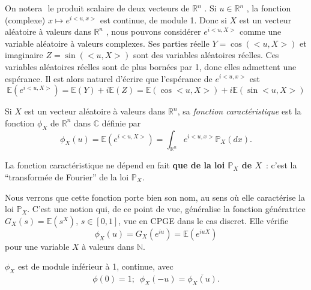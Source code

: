 On notera \(< x, y >\) le produit scalaire de deux vecteurs de
\(\mathbb{R}^n\) . Si \(u \in \mathbb{R}^n\) , la fonction (complexe)
\(x \mapsto e^{i < u,x>}\) est continue, de module 1. Donc si \(X\) est
un vecteur aléatoire à valeurs dans \(\mathbb{R}^n\) , nous pouvons
considérer \(e^{i < u,X>}\) comme une variable aléatoire à valeurs
complexes. Ses parties réelle \(Y = \cos(< u, X>)\) et imaginaire
\(Z = \sin(< u, X>)\) sont des variables aléatoires réelles. Ces
variables aléatoires réelles sont de plus bornées par 1, donc elles
admettent une espérance. Il est alors naturel d'écrire que l'espérance
de \(e^{i < u,x>}\) est
\[\mathbb{E}(e^{i < u,X>}) = \mathbb{E}(Y) + i \mathbb{E}(Z) = \mathbb{E}(\cos< u, X>) + i\mathbb{E}(\sin< u, X>) \]

\begin{definition}\label{IV-fonction-caractuxe9ristique}

Si \(X\) est un vecteur aléatoire à valeurs dans \(\mathbb{R}^n\), sa
\emph{fonction caractéristique} est la fonction \(\phi_X\) de
\(\mathbb{R}^n\) dans \(\mathbb{C}\) définie par
\[ \phi_X(u) = \mathbb{E}(e^{i < u,X>}) = \int_{\mathbb{R}^n} e^{i < u,x>} \mathbb{P}_X(dx).\]
\end{definition}

\begin{remarque}[{Interprétation}]\label{IV-interpruxe9tation-1}

La fonction caractéristique ne dépend en fait \textbf{que de la loi
\(\mathbb{P}_X\) de \(X\)}~: c'est la ``transformée de Fourier'' de la
loi \(\mathbb{P}_X\).

Nous verrons que cette fonction porte bien son nom, au sens où elle
caractérise la loi \(\mathbb{P}_X\). C'est une notion qui, de ce point
de vue, généralise la fonction génératrice
\(G_X(s) = \mathbb{E}(s^X), \, s \in [0,1]\), vue en CPGE dans le cas
discret. Elle vérifie \[\phi_X(u) = G_X(e^{iu}) = \mathbb{E}(e^{iuX}) \]
pour une variable \(X\) à valeurs dans \(\mathbb{N}\).
\end{remarque}

\begin{proposition}\label{IV-propriuxe9tuxe9s-de-la-fonction-caractuxe9ristique}

\(\phi_X\) est de module inférieur à 1, continue, avec
\[ \phi(0) = 1 ;\,\,\, \phi_X(-u) = \overline{\phi_X(u)}.\]
\end{proposition}

